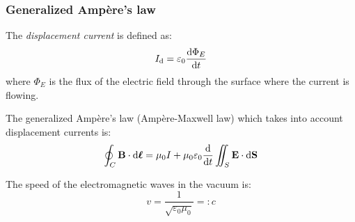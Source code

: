 \documentclass[../../../main.tex]{subfiles}
\begin{document}
\begin{multicols}{2}
    \subsubsection*{Generalized Ampère's law}
    \begin{definition}
        The \textit{displacement current} is defined as: $$I_\text{d}=\varepsilon_0\dv{\Phi_E}{t}$$ where $\Phi_E$ is the flux of the electric field through the surface where the current is flowing.
    \end{definition}
    \begin{law}
        The generalized Ampère's law (Ampère-Maxwell law) which takes into account displacement currents is: $$\oint_C\boldsymbol{\mathrm{B}}\cdot \dd\vb*{\ell}=\mu_0 I+\mu_0\varepsilon_0\dv{}{t}\iint_S\boldsymbol{\mathrm{E}}\cdot \dd\boldsymbol{\mathrm{S}}$$
    \end{law}
    \begin{definition}
        The speed of the electromagnetic waves in the vacuum is: $$v=\frac{1}{\sqrt{\varepsilon_0\mu_0}}=:c$$
    \end{definition}
\end{multicols}
\end{document}
